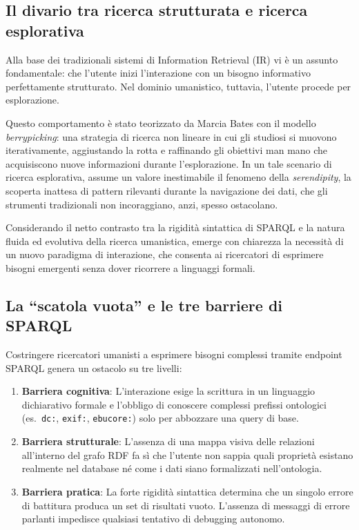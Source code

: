 \documentclass[12pt,a4paper,oneside]{book}
\newcommand{\code}[1]{\colorbox{light-gray}{\texttt{#1}}}
\begin{document}
\subsection{Il divario tra ricerca strutturata e ricerca esplorativa}\label{subsec:berrypicking}

Alla base dei tradizionali sistemi di Information Retrieval (IR) vi è un assunto fondamentale: che l'utente inizi l'interazione con un bisogno informativo perfettamente strutturato.
Nel dominio umanistico, tuttavia, l'utente procede per esplorazione.

Questo comportamento è stato teorizzato da Marcia Bates con il modello \textit{berrypicking}\cite{Bat89}: una strategia di ricerca non lineare in cui gli studiosi si muovono iterativamente, aggiustando la rotta e raffinando gli obiettivi man mano che acquisiscono nuove informazioni durante l'esplorazione.
In un tale scenario di ricerca esplorativa, assume un valore inestimabile il fenomeno della \textit{serendipity}, la scoperta inattesa di pattern rilevanti durante la navigazione dei dati, che gli strumenti tradizionali non incoraggiano, anzi, spesso ostacolano.

Considerando il netto contrasto tra la rigidità sintattica di SPARQL e la natura fluida ed evolutiva della ricerca umanistica, emerge con chiarezza la necessità di un nuovo paradigma di interazione, che consenta ai ricercatori di esprimere bisogni emergenti senza dover ricorrere a linguaggi formali.

\subsection{La ``scatola vuota'' e le tre barriere di SPARQL}\label{subsec:tre_barriere}

Costringere ricercatori umanisti a esprimere bisogni complessi tramite endpoint SPARQL genera un ostacolo su tre livelli:

\begin{enumerate}
    \item \textbf{Barriera cognitiva}: L'interazione esige la scrittura in un linguaggio dichiarativo formale e l'obbligo di conoscere complessi prefissi ontologici (es.\ \code{dc:}, \code{exif:}, \code{ebucore:}) solo per abbozzare una query di base.
    \item \textbf{Barriera strutturale}: L'assenza di una mappa visiva delle relazioni all'interno del grafo RDF fa sì che l'utente non sappia quali proprietà esistano realmente nel database né come i dati siano formalizzati nell'ontologia.
    \item \textbf{Barriera pratica}: La forte rigidità sintattica determina che un singolo errore di battitura produca un set di risultati vuoto. L'assenza di messaggi di errore parlanti impedisce qualsiasi tentativo di debugging autonomo.
\end{enumerate}
\end{document}
